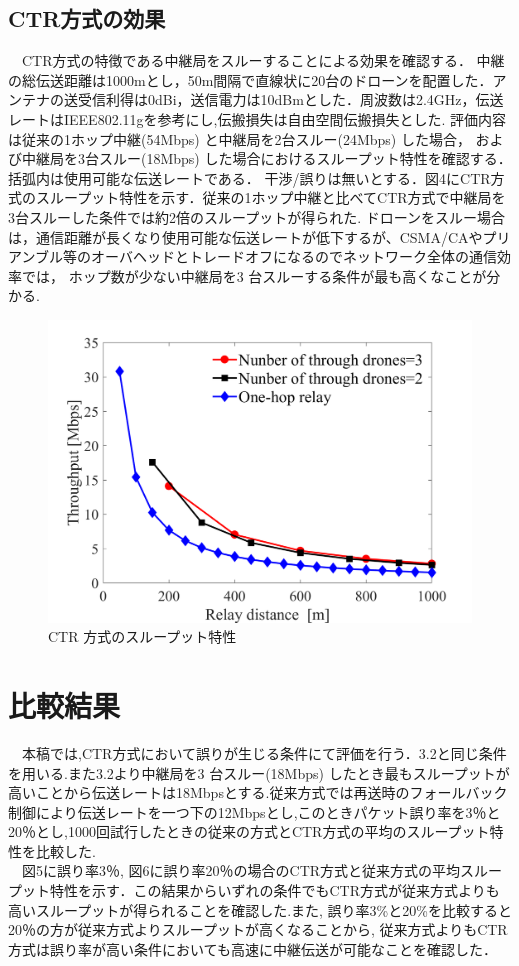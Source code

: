 \documentclass[a4paper,10pt]{ltjsarticle}
\begin{document}
\subsection{CTR方式の効果}
　CTR方式の特徴である中継局をスルーすることによる効果を確認する．
中継の総伝送距離は1000mとし，50m間隔で直線状に20台のドローンを配置した．アンテナの送受信利得は0dBi，送信電力は10dBmとした．周波数は2.4GHz，伝送レートはIEEE802.11gを参考にし,伝搬損失は自由空間伝搬損失とした.
評価内容は従来の1ホップ中継(54Mbps) と中継局を2台スルー(24Mbps) した場合，
および中継局を3台スルー(18Mbps) した場合におけるスループット特性を確認する．括弧内は使用可能な伝送レートである．
干渉/誤りは無いとする．図4にCTR方式のスループット特性を示す．従来の1ホップ中継と比べてCTR方式で中継局を3台スルーした条件では約2倍のスループットが得られた.
ドローンをスルー場合は，通信距離が長くなり使用可能な伝送レートが低下するが、CSMA/CAやプリアンブル等のオーバヘッドとトレードオフになるのでネットワーク全体の通信効率では，
ホップ数が少ない中継局を3 台スルーする条件が最も高くなことが分かる.
\begin{figure}[H]
  \centering
  \includegraphics[width=\linewidth]{throughtput_vs_placement_50m_max_distance_3.png} %
  \caption{CTR 方式のスループット特性}
  \label{fig:throughput_through} %
\end{figure}
\section{比較結果}
　本稿では,CTR方式において誤りが生じる条件にて評価を行う．3.2と同じ条件を用いる.また3.2より中継局を3 台スルー(18Mbps) したとき最もスループットが高いことから伝送レートは18Mbpsとする.従来方式では再送時のフォールバック制御により伝送レートを一つ下の12Mbpsとし,このときパケット誤り率を3％と20％とし,1000回試行したときの従来の方式とCTR方式の平均のスループット特性を比較した.
\\　図5に誤り率3％, 図6に誤り率20％の場合のCTR方式と従来方式の平均スループット特性を示す．この結果からいずれの条件でもCTR方式が従来方式よりも高いスループットが得られることを確認した.また, 誤り率3\%と20\%を比較すると20％の方が従来方式よりスループットが高くなることから, 従来方式よりもCTR方式は誤り率が高い条件においても高速に中継伝送が可能なことを確認した．
\end{document}

